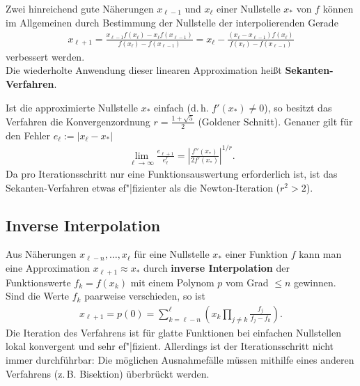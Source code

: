 Zwei hinreichend gute Näherungen $x_{\ell-1}$ und $x_\ell$ einer Nullstelle
$x_\ast$ von $f$ können im Allgemeinen durch Bestimmung der Nullstelle
der interpolierenden Gerade
\begin{align*}
    x_{\ell+1}
    = \frac{x_{\ell-1} f(x_\ell) - x_\ell f(x_{\ell-1})}
    {f(x_\ell) - f(x_{\ell-1})}
    = x_\ell - \frac{(x_\ell - x_{\ell-1}) f(x_\ell)}
    {f(x_\ell) - f(x_{\ell-1})}
\end{align*}
verbessert werden. \\
Die wiederholte Anwendung dieser linearen Approximation heißt
\textbf{Sekanten-Verfahren}.

Ist die approximierte Nullstelle $x_\ast$ einfach
(d.\,h. $f'(x_\ast) \not= 0$), so besitzt das Verfahren
die Konvergenzordnung $r = \frac{1 + \sqrt{5}}{2}$ (Goldener Schnitt).
Genauer gilt für den Fehler $e_\ell := |x_\ell - x_\ast|$
\begin{align*}
    \lim_{\ell \to \infty} \frac{e_{\ell+1}}{e_\ell^r}
    = \left|\frac{f''(x_\ast)}{2 f'(x_\ast)}\right|^{1/r}.
\end{align*}
Da pro Iterationsschritt nur eine Funktionsauswertung erforderlich ist,
ist das Sekanten-Verfah\-ren etwas ef"|fizienter als die Newton-Iteration
($r^2 > 2$).

\pagebreak

\subsection{%
    Inverse Interpolation%
}

Aus Näherungen $x_{\ell-n}, \dotsc, x_\ell$ für eine Nullstelle $x_\ast$
einer Funktion $f$ kann man eine Approximation $x_{\ell+1} \approx x_\ast$
durch \textbf{inverse Interpolation} der Funktionswerte $f_k = f(x_k)$
mit einem Polynom $p$ vom Grad $\le n$ gewinnen.
Sind die Werte $f_k$ paarweise verschieden, so ist
\begin{align*}
    x_{\ell+1} = p(0)
    = \sum_{k=\ell-n}^\ell \left(x_k
    \prod_{j\not=k} \frac{f_j}{f_j - f_k}\right).
\end{align*}
Die Iteration des Verfahrens ist für glatte Funktionen bei einfachen
Nullstellen lokal konvergent und sehr ef"|fizient.
Allerdings ist der Iterationsschritt nicht immer durchführbar:
Die möglichen Ausnahmefälle müssen mithilfe eines anderen Verfahrens
(z.\,B. Bisektion) überbrückt werden.

\linie

